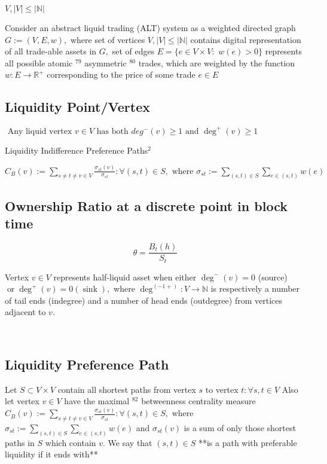 $ V,|V| \leq|\mathbb{N}| $

Consider an abstract liquid trading (ALT) system as a weighted directed graph $G:=(V, E, w),$ where set of vertices $V,|V| \leq|\mathbb{N}|$ contains digital representation of all trade-able assets in $G,$ set of edges $E=\{e \in V \times V:$ $w(e)>0\}$ represents all possible atomic $^{79}$ asymmetric $^{80}$ trades, which are weighted by the function $w: E \rightarrow \mathbb{R}^{+}$ corresponding to the price of some trade $e \in E$


\subsection{Liquidity Point/Vertex}

$
\text { Any liquid vertex } v \in V \text{ has both } d e g^{-}(v) \geq 1 \text{ and } \operatorname{deg}^{+}(v) \geq 1
$


Liquidity Indifference Preference Paths$^{2}$

$C_{B}(v):=\sum_{s \neq t \neq v \in V} \frac{\sigma_{s t}(v)}{\sigma_{s t}}: \forall(s, t) \in S, \text{ where } \sigma_{s t}:=\sum_{(s, t) \in S} \sum_{e \in(s, t)} w(e)$


\subsection{Ownership Ratio at a discrete point in block time}


\label{Ownership Ratio at a discrete point in block time}
\begin{equation}
\theta=\frac{B_{t}(h)}{S_{t}}
\end{equation}


Vertex $v \in V$ represents half-liquid asset  when either $\operatorname{deg}^{-}(v)=0$ (source) $\operatorname{or} \operatorname{deg}^{+}(v)=0(\operatorname{sink}),$ where $\operatorname{deg}^{(-1+)}: V \rightarrow \mathbb{N}$ is respectively a number
of tail ends (indegree) and a number of head ends (outdegree) from vertices adjacent to $v$.

\
\subsection{Liquidity Preference Path}

Let $S \subset V \times V$ contain all shortest paths from vertex $s$ to vertex $t: \forall s, t \in V$ Also let vertex $v \in V$ have the maximal $^{82}$ betweenness centrality measure $C_{B}(v):=\sum_{s \neq t \neq v \in V} \frac{\sigma_{s t}(v)}{\sigma_{s t}}: \forall(s, t) \in S,$ where $\sigma_{s t}:=\sum_{(s, t) \in S} \sum_{e \in(s, t)} w(e)$
and $\sigma_{s t}(v)$ 
is a sum of only those shortest paths in $S$ which contain $v .$ We say that $(s, t) \in S$ **is a path with preferable liquidity if it ends with** 

